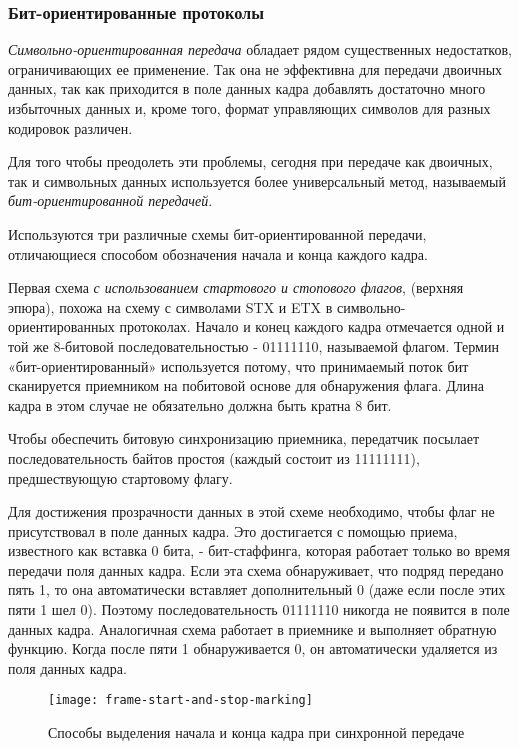 \subsubsection{Бит-ориентированные протоколы}

\emph{Символьно-ориентированная передача} обладает рядом существенных недостатков, ограничивающих ее применение.
Так она не эффективна для передачи двоичных данных, так как приходится в поле данных кадра добавлять достаточно много избыточных данных и, кроме того, формат управляющих символов для разных кодировок различен.

Для того чтобы преодолеть эти проблемы, сегодня при передаче как двоичных, так и символьных данных используется более универсальный метод, называемый \emph{бит-ориентированной передачей}.

Используются три различные схемы бит-ориентированной передачи, отличающиеся способом обозначения начала и конца каждого кадра.

Первая схема \emph{с использованием стартового и стопового флагов}, (верхняя эпюра), похожа на схему с символами STX и ETX в символьно-ориентированных протоколах.
Начало и конец каждого кадра отмечается одной и той же 8-битовой последовательностью - 01111110, называемой флагом.
Термин «бит-ориентированный» используется потому, что принимаемый поток бит сканируется приемником на побитовой основе для обнаружения флага.
Длина кадра в этом случае не обязательно должна быть кратна 8 бит.

Чтобы обеспечить битовую синхронизацию приемника, передатчик посылает последовательность байтов простоя (каждый состоит из 11111111), предшествующую стартовому флагу.

Для достижения прозрачности данных в этой схеме необходимо, чтобы флаг не присутствовал в поле данных кадра.
Это достигается с помощью приема, известного как вставка 0 бита, - бит-стаффинга, которая работает только во время передачи поля данных кадра.
Если эта схема обнаруживает, что подряд передано пять 1, то она автоматически вставляет дополнительный 0 (даже если после этих пяти 1 шел 0).
Поэтому последовательность 01111110 никогда не появится в поле данных кадра.
Аналогичная схема работает в приемнике и выполняет обратную функцию.
Когда после пяти 1 обнаруживается 0, он автоматически удаляется из поля данных кадра.

\begin{figure}
    \centering
    \texttt{[image: frame-start-and-stop-marking]}
    \caption{Способы выделения начала и конца кадра при синхронной передаче}
    \label{fig:frame-start-and-stop-marking}
\end{figure}

